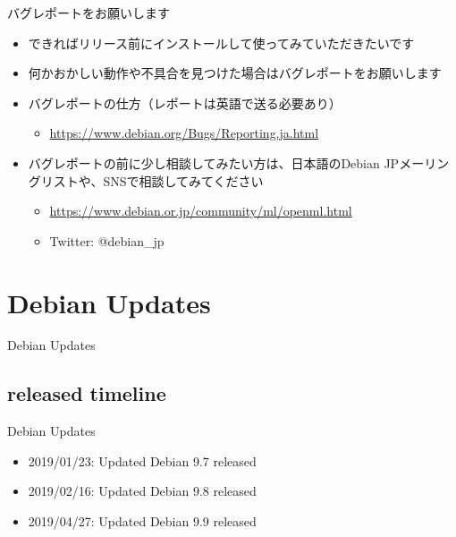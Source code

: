 \begin{frame}{バグレポートをお願いします}%
  \begin{itemize}
  \item できればリリース前にインストールして使ってみていただきたいです
  \item 何かおかしい動作や不具合を見つけた場合はバグレポートをお願いします
  \item バグレポートの仕方（レポートは英語で送る必要あり）
    \begin{itemize}
    \item \url{https://www.debian.org/Bugs/Reporting.ja.html}
    \end{itemize}
  \item バグレポートの前に少し相談してみたい方は、日本語のDebian JPメーリングリストや、SNSで相談してみてください
    \begin{itemize}
    \item \url{https://www.debian.or.jp/community/ml/openml.html}
    \item Twitter: @debian\_jp
    \end{itemize}
  \end{itemize}
\end{frame}


\section{Debian Updates}


\begin{frame}
  \begin{center}\Huge{Debian Updates}\end{center}
\end{frame}


\subsection{released timeline}

\begin{frame}{Debian Updates}%

\begin{itemize}
  \item 2019/01/23:  Updated Debian 9.7  released
  \item 2019/02/16:  Updated Debian 9.8  released
  \item 2019/04/27:  Updated Debian 9.9  released
\end{itemize}

\end{frame}


